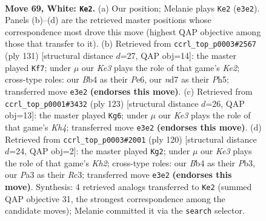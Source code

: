 \documentclass[11pt]{article}
\begin{document}
\clearpage

\begin{figure}[p]\centering
\begin{subfigure}{0.46\textwidth}\centering
\resizebox{\linewidth}{!}{%
\newchessgame
\chessboard[
  setfen={7k/3n1R2/8/3r4/pB3P1p/P3K2P/8/8 w - - 1 69},
  showmover=false,
  pgfstyle=straightmove, color=movearrow, markmove={e3-e2}
]}
\caption{}
\end{subfigure}\hfill
\begin{subfigure}{0.46\textwidth}\centering
\resizebox{\linewidth}{!}{%
\newchessgame
\chessboard[
  setfen={8/4k3/1p2p3/1p1r3p/4N2R/P1K5/8/8 b - - 57 66},
  showmover=false,
  pgfstyle=straightmove, color=movearrow, markmove={e7-f7}
]}
\caption{}
\end{subfigure}
\\[4pt]
\begin{subfigure}{0.46\textwidth}\centering
\resizebox{\linewidth}{!}{%
\newchessgame
\chessboard[
  setfen={5R2/pp6/2b5/4B1pk/8/P3N2r/1P1K4/8 b - - 17 62},
  showmover=false,
  pgfstyle=straightmove, color=movearrow, markmove={h5-g6}
]}
\caption{}
\end{subfigure}\hfill
\begin{subfigure}{0.46\textwidth}\centering
\resizebox{\linewidth}{!}{%
\newchessgame
\chessboard[
  setfen={8/3Pk3/4n3/1B1p3p/7r/1PR5/7K/8 w - - 2 61},
  showmover=false,
  pgfstyle=straightmove, color=movearrow, markmove={h2-g2}
]}
\caption{}
\end{subfigure}
\caption{\textbf{Move 69, White: \texttt{Ke2}.} (a) Our position; Melanie plays \texttt{Ke2} (\texttt{e3e2}). Panels (b)--(d) are the retrieved master positions whose correspondence most drove this move (highest QAP objective among those that transfer to it). (b) Retrieved from \texttt{ccrl\_top\_p0003\#2567} (ply 131) [structural distance $d$=27, QAP obj=14]: the master played \texttt{Kf7}; under $\mu$ our \emph{Ke3} plays the role of that game's \emph{Ke2}; cross-type roles: our \emph{B}b4 as their \emph{P}e6, our \emph{n}d7 as their \emph{P}h5; transferred move \texttt{e3e2} \textbf{(endorses this move)}. (c) Retrieved from \texttt{ccrl\_top\_p0001\#3432} (ply 123) [structural distance $d$=26, QAP obj=13]: the master played \texttt{Kg6}; under $\mu$ our \emph{Ke3} plays the role of that game's \emph{Kh4}; transferred move \texttt{e3e2} \textbf{(endorses this move)}. (d) Retrieved from \texttt{ccrl\_top\_p0003\#2001} (ply 120) [structural distance $d$=24, QAP obj=2]: the master played \texttt{Kg2}; under $\mu$ our \emph{Ke3} plays the role of that game's \emph{Kh2}; cross-type roles: our \emph{B}b4 as their \emph{P}b3, our \emph{P}a3 as their \emph{R}c3; transferred move \texttt{e3e2} \textbf{(endorses this move)}. Synthesis: 4 retrieved analogs transferred to \texttt{Ke2} (summed QAP objective 31, the strongest correspondence among the candidate moves); Melanie committed it via the \texttt{search} selector.}
\label{fig:thought-m136}
\end{figure}
\end{document}
